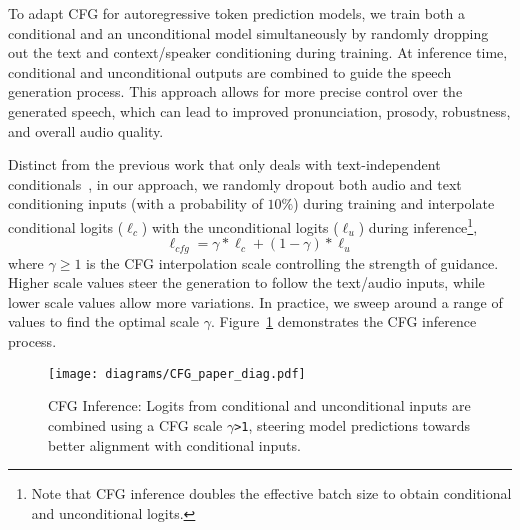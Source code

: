 To adapt CFG for autoregressive token prediction models, we train both a conditional and an unconditional model simultaneously by randomly dropping out the text and context/speaker conditioning during training. At inference time, conditional and unconditional outputs are combined to guide the speech generation process. This approach allows for more precise control over the generated speech, which can lead to improved pronunciation, prosody, robustness, and overall audio quality. 

Distinct from the previous work that only deals with text-independent conditionals~\cite{darefsky2024parakeet}, in our approach, we randomly dropout both audio and text conditioning inputs (with a probability of $10\%$) during training and interpolate conditional logits ($\ell_{c}$) with the unconditional logits ($\ell_{u}$) during inference\footnote{Note that CFG inference doubles the effective batch size to obtain conditional and unconditional logits.}, 
\begin{equation*}
    \ell_\textit{cfg} = \gamma * \ell_{c} + (1 - \gamma) * \ell_{u}
\end{equation*}
where $\gamma\ge1$ is the CFG interpolation scale controlling the strength of guidance. Higher scale values steer the generation to follow the text/audio inputs, while lower scale values allow more variations. In practice, we sweep around a range of values to find the optimal scale $\gamma$. 
Figure~\ref{figs:cfg} demonstrates the CFG inference process. 

\begin{figure}[!ht]
    \centering
    \texttt{[image: diagrams/CFG\_paper\_diag.pdf]}
    \vspace{-8mm} 
    \caption{\footnotesize{CFG Inference: Logits from conditional and unconditional inputs are combined using a CFG scale $\gamma$\texttt{>1}, steering model predictions towards better alignment with conditional inputs.}}
    \label{figs:cfg}
     \vspace{-4mm} 
\end{figure}

